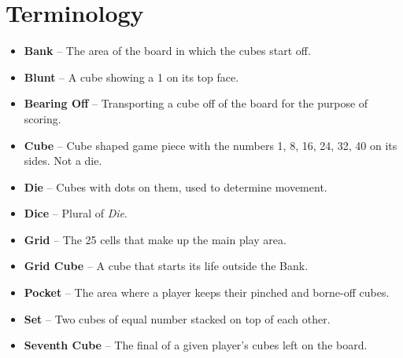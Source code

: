 \section{Terminology}
\begin{itemize}
    \item \textbf{Bank} -- The area of the board in which the cubes start off.
    \item \textbf{Blunt} -- A cube showing a 1 on its top face.
    \item \textbf{Bearing Off} -- Transporting a cube off of the board for the purpose of scoring.
    \item \textbf{Cube} -- Cube shaped game piece with the numbers 1, 8, 16, 24, 32, 40 on its sides. Not a die.
    \item \textbf{Die} -- Cubes with dots on them, used to determine movement.
    \item \textbf{Dice} -- Plural of \textit{Die}.
    \item \textbf{Grid} -- The 25 cells that make up the main play area.
    \item \textbf{Grid Cube} -- A cube that starts its life outside the Bank.
    \item \textbf{Pocket} -- The area where a player keeps their pinched and borne-off cubes.
    \item \textbf{Set} -- Two cubes of equal number stacked on top of each other.
    \item \textbf{Seventh Cube} -- The final of a given player's cubes left on the board.
\end{itemize}